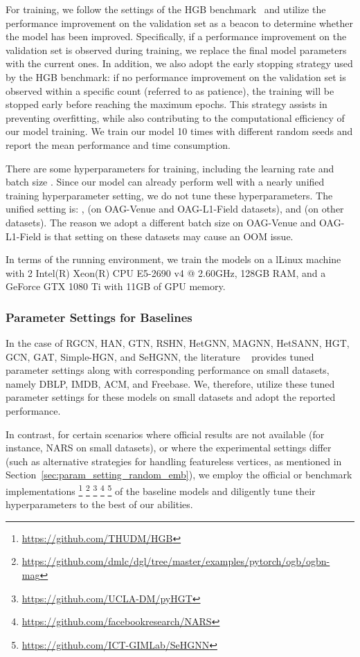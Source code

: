 \documentclass[lettersize,journal]{IEEEtran}
\begin{document}
For training, we follow the settings of the HGB benchmark~\cite{DBLP:conf/kdd/LvDLCFHZJDT21} and utilize the performance improvement on the validation set as a beacon to determine whether the model has been improved.
Specifically, if a performance improvement on the validation set is observed during training, we replace the final model parameters with the current ones.
In addition, we also adopt the early stopping strategy used by the HGB benchmark: if no performance improvement on the validation set is observed within a specific count (referred to as patience), the training will be stopped early before reaching the maximum epochs.
This strategy assists in preventing overfitting, while also contributing to the computational efficiency of our model training.
We train our model 10 times with different random seeds and report the mean performance and time consumption.




There are some hyperparameters for training, including the learning rate  and batch size .
Since our model can already perform well with a nearly unified training hyperparameter setting, we do not tune these hyperparameters.
The unified setting is: ,  (on OAG-Venue and OAG-L1-Field datasets), and  (on other datasets).
The reason we adopt a different batch size on OAG-Venue and OAG-L1-Field is that setting  on these datasets may cause an OOM issue.


In terms of the running environment, we train the models on a lLinux machine with 2 Intel(R) Xeon(R) CPU E5-2690 v4 @ 2.60GHz, 128GB RAM, and a GeForce GTX 1080 Ti with 11GB of GPU memory.







\subsubsection{Parameter Settings for Baselines}
In the case of RGCN, HAN, GTN, RSHN, HetGNN, MAGNN, HetSANN, HGT, GCN, GAT, Simple-HGN, and SeHGNN, the literature ~\cite{DBLP:conf/kdd/LvDLCFHZJDT21,yang2022simple} provides tuned parameter settings along with corresponding performance on small datasets, namely DBLP, IMDB, ACM, and Freebase.
We, therefore, utilize these tuned parameter settings for these models on small datasets and adopt the reported performance.

In contrast, for certain scenarios where official results are not available (for instance, NARS on small datasets), or where the experimental settings differ (such as alternative strategies for handling featureless vertices, as mentioned in Section~\ref{sec:param_setting_random_emb}), we employ the official or benchmark implementations
\footnote{\url{https://github.com/THUDM/HGB}}
\footnote{\url{https://github.com/dmlc/dgl/tree/master/examples/pytorch/ogb/ogbn-mag}}
\footnote{\url{https://github.com/UCLA-DM/pyHGT}}
\footnote{\url{https://github.com/facebookresearch/NARS}}
\footnote{\url{https://github.com/ICT-GIMLab/SeHGNN}} 
of the baseline models and diligently tune their hyperparameters to the best of our abilities.
\end{document}
